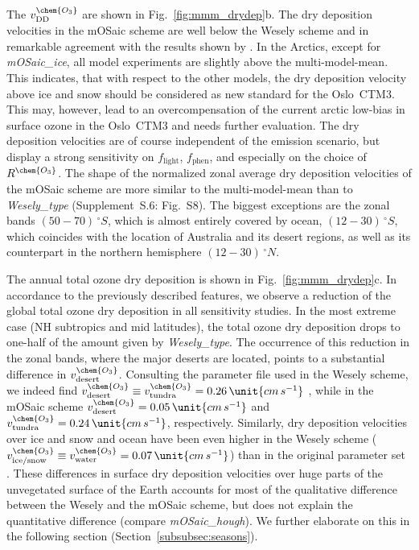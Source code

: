 \documentclass[gmd, manuscript]{copernicus}
\begin{document}
The $v^\chem{O_3}_\text{DD}$ are shown in Fig.~\ref{fig:mmm_drydep}b. The dry deposition velocities in the mOSaic scheme are well below the Wesely scheme and in remarkable agreement with the results shown by \citet{ACP:Hardacre2015}. In the Arctics, except for \emph{mOSaic\_ice}, all model experiments are slightly above the multi-model-mean. This indicates, that with respect to the other models, the \citet{ACP:Helmig2007} dry deposition velocity above ice and snow should be considered as new standard for the Oslo~CTM3. This may, however, lead to an overcompensation of the current arctic low-bias in surface ozone in the Oslo~CTM3 and needs further evaluation. The dry deposition velocities are of course independent of the emission scenario, but display a strong sensitivity on $f_\text{light}$, $f_\text{phen}$, and especially on the choice of $R^\chem{O_3}$. The shape of the normalized zonal average dry deposition velocities of the mOSaic scheme are more similar to the multi-model-mean than to \emph{Wesely\_type} (Supplement~S.6: Fig.~S8). The biggest exceptions are the zonal bands $(50-70)\,\unit{^\circ S}$, which is almost entirely covered by ocean, $(12-30)\,\unit{^\circ S}$, which coincides with the location of Australia and its desert regions, as well as its counterpart in the northern hemisphere $(12-30)\,\unit{^\circ N}$.

The annual total ozone dry deposition is shown in Fig.~\ref{fig:mmm_drydep}c. In accordance to the previously described features, we observe a reduction of the global total ozone dry deposition in all sensitivity studies. In the most extreme case (NH subtropics and mid latitudes), the total ozone dry deposition drops to one-half of the amount given by \emph{Wesely\_type}. The occurrence of this reduction in the zonal bands, where the major deserts are located, points to a substantial difference in $v_\text{desert}^\chem{O_3}$. Consulting the parameter file used in the Wesely scheme, we indeed find $v_\text{desert}^\chem{O_3} \equiv v_\text{tundra}^\chem{O_3} = 0.26\,\unit{cm\,s^{-1}}$ \citep{JGR:Hough1991}, while in the mOSaic scheme $v_\text{desert}^\chem{O_3}=0.05\,\unit{cm\,s^{-1}}$ and $v^\chem{O_3}_\text{tundra} = 0.24\,\unit{cm\,s^{-1}}$, respectively. Similarly, dry deposition velocities over ice and snow and ocean have been even higher in the Wesely scheme ($v_\text{ice/snow}^\chem{O_3}\equiv v_\text{water}^\chem{O_3}=0.07\,\unit{cm\,s^{-1}}$) than in the original parameter set \citep[$v_\text{ice/snow}^\chem{O_3}\equiv v_\text{water}^\chem{O_3}=0.05\,\unit{cm\,s^{-1}}$,][]{ACP:Simpson2012}. These differences in surface dry deposition velocities over huge parts of the unvegetated surface of the Earth accounts for most of the qualitative difference between the Wesely and the mOSaic scheme, but does not explain the quantitative difference (compare \emph{mOSaic\_hough}). We further elaborate on this in the following section (Section~\ref{subsubsec:seasons}).
\end{document}
